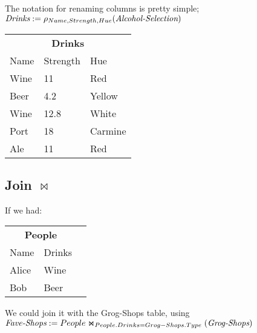 The notation for renaming columns is pretty simple; $\text{\it Drinks} :=
\rho_{Name, Strength, Hue}(\text{\it Alcohol-Selection})$

\begin{center}
  \begin{tabular}{lll}
    \multicolumn{3}{c}{\textbf{Drinks}}\\
    {Name} & {Strength} & {Hue}\\ \hline
    Wine          & 11                & Red\\
    Beer          & 4.2               & Yellow\\
    Wine          & 12.8              & White\\
    Port          & 18                & Carmine\\
    Ale           & 11                & Red\\
  \end{tabular}
\end{center}

\subsection{Join $\Join$}

If we had:

\begin{center}
  \begin{tabular}{lll}
    \multicolumn{2}{c}{\textbf{People}}\\
    {Name} & {Drinks}\\ \hline
    Alice  & Wine\\ 
    Bob    & Beer\\ 
  \end{tabular}
\end{center}

We could join it with the Grog-Shops table, using $\text{\it Fave-Shops} :=
People \Join_{People.Drinks=Grog-Shops.Type}(\text{\it Grog-Shops})$

